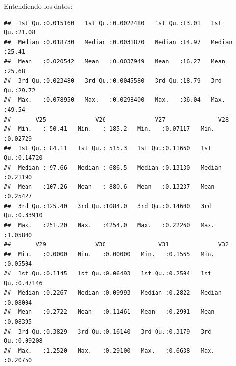 \documentclass[ignorenonframetext,]{beamer}
\begin{document}
\begin{frame}[fragile]
\begin{block}{Entendiendo los datos:}
\begin{verbatim}
##  1st Qu.:0.015160   1st Qu.:0.0022480   1st Qu.:13.01   1st Qu.:21.08  
##  Median :0.018730   Median :0.0031870   Median :14.97   Median :25.41  
##  Mean   :0.020542   Mean   :0.0037949   Mean   :16.27   Mean   :25.68  
##  3rd Qu.:0.023480   3rd Qu.:0.0045580   3rd Qu.:18.79   3rd Qu.:29.72  
##  Max.   :0.078950   Max.   :0.0298400   Max.   :36.04   Max.   :49.54  
##       V25              V26              V27               V28         
##  Min.   : 50.41   Min.   : 185.2   Min.   :0.07117   Min.   :0.02729  
##  1st Qu.: 84.11   1st Qu.: 515.3   1st Qu.:0.11660   1st Qu.:0.14720  
##  Median : 97.66   Median : 686.5   Median :0.13130   Median :0.21190  
##  Mean   :107.26   Mean   : 880.6   Mean   :0.13237   Mean   :0.25427  
##  3rd Qu.:125.40   3rd Qu.:1084.0   3rd Qu.:0.14600   3rd Qu.:0.33910  
##  Max.   :251.20   Max.   :4254.0   Max.   :0.22260   Max.   :1.05800  
##       V29              V30               V31              V32         
##  Min.   :0.0000   Min.   :0.00000   Min.   :0.1565   Min.   :0.05504  
##  1st Qu.:0.1145   1st Qu.:0.06493   1st Qu.:0.2504   1st Qu.:0.07146  
##  Median :0.2267   Median :0.09993   Median :0.2822   Median :0.08004  
##  Mean   :0.2722   Mean   :0.11461   Mean   :0.2901   Mean   :0.08395  
##  3rd Qu.:0.3829   3rd Qu.:0.16140   3rd Qu.:0.3179   3rd Qu.:0.09208  
##  Max.   :1.2520   Max.   :0.29100   Max.   :0.6638   Max.   :0.20750
\end{verbatim}

\end{block}

\end{frame}
\end{document}
